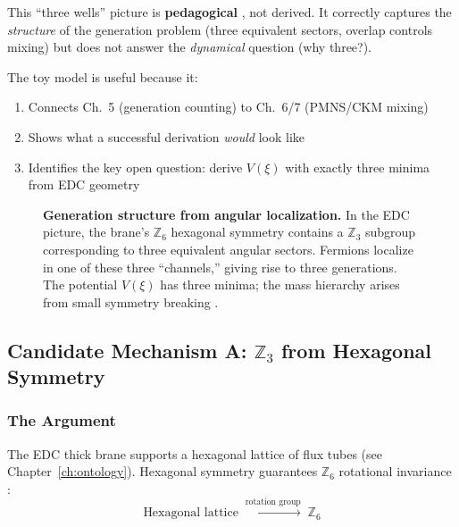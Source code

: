 \begin{tcolorbox}[colback=yellow!5!white, colframe=yellow!60!black,
    title=\textbf{Toy Model Status}]
This ``three wells'' picture is \textbf{pedagogical} \tagP{}, not derived.
It correctly captures the \emph{structure} of the generation problem (three
equivalent sectors, overlap controls mixing) but does not answer the
\emph{dynamical} question (why three?).

The toy model is useful because it:
\begin{enumerate}[nosep]
    \item Connects Ch.~5 (generation counting) to Ch.~6/7 (PMNS/CKM mixing)
    \item Shows what a successful derivation \emph{would} look like
    \item Identifies the key open question: derive $V(\xi)$ with exactly
          three minima from EDC geometry
\end{enumerate}
\end{tcolorbox}

\begin{figure}[htbp]
\centering

\caption{\textbf{Generation structure from angular localization.}
In the EDC picture, the brane's $\mathbb{Z}_6$ hexagonal symmetry contains a
$\mathbb{Z}_3$ subgroup corresponding to three equivalent angular sectors.
Fermions localize in one of these three ``channels,'' giving rise to three
generations. The potential $V(\xi)$ has three minima; the mass hierarchy
arises from small symmetry breaking \tagP{}.}
\label{fig:ch5_three_channels}
\end{figure}

\subsection{\texorpdfstring{Candidate Mechanism A: $\mathbb{Z}_3$ from Hexagonal Symmetry}{Candidate Mechanism A: Z3 from Hexagonal Symmetry}}
\label{sec:ch5_mechanism_a}

\subsubsection{The Argument}

The EDC thick brane supports a hexagonal lattice of flux tubes (see Chapter~\ref{ch:ontology}).
Hexagonal symmetry guarantees $\mathbb{Z}_6$ rotational invariance \tagDc{}:
\begin{equation}
    \text{Hexagonal lattice} \;\xrightarrow{\text{rotation group}}\; \mathbb{Z}_6
    \label{eq:ch5_hex_to_z6}
\end{equation}


